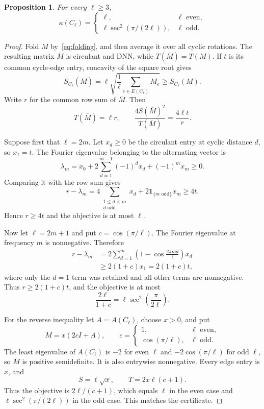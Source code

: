 \documentclass[11pt]{article}
\newtheorem{proposition}[theorem]{Proposition}
\theoremstyle{remark}
\begin{document}
\begin{proposition}\label{prop:cycle}
For every $\ell\geq3$,
\[
 \kappa(C_\ell)=
 \begin{cases}
  \ell,&\ell\text{ even},\\[1mm]
  \ell\sec^2(\pi/(2\ell)),&\ell\text{ odd}.
 \end{cases}
\]
\end{proposition}

\begin{proof}
 Fold $M$ by~\eqref{eq:folding}, and then average it over all cyclic
 rotations.  The resulting matrix $\overline M$ is circulant and DNN, while
 $T(\overline M)=T(M)$.  If $t$ is its common cycle-edge entry, concavity of
 the square root gives
 \[
  S_{C_\ell}(\overline M)
  =\ell\sqrt{\frac1\ell\sum_{e\in E(C_\ell)}M_e}
  \geq S_{C_\ell}(M).
 \]
 Write $r$ for the common row sum of $\overline M$.  Then
 \[
  T(\overline M)=\ell r,
  \qquad
  \frac{4S(\overline M)^2}{T(\overline M)}=\frac{4\ell t}{r}.
 \]

 Suppose first that $\ell=2m$.  Let $x_d\geq0$ be the circulant entry at
 cyclic distance $d$, so $x_1=t$.  The Fourier eigenvalue belonging to the
 alternating vector is
 \[
  \lambda_m=x_0+2\sum_{d=1}^{m-1}(-1)^d x_d+(-1)^m x_m\geq0.
 \]
 Comparing it with the row sum gives
 \[
  r-\lambda_m
  =4\sum_{\substack{1\leq d<m\\d\text{ odd}}}x_d
   +2\mathbf1_{\{m\text{ odd}\}}x_m
  \geq4t.
 \]
 Hence $r\geq4t$ and the objective is at most $\ell$.

 Now let $\ell=2m+1$ and put $c=\cos(\pi/\ell)$.  The Fourier eigenvalue at
 frequency $m$ is nonnegative.  Therefore
 \begin{align*}
  r-\lambda_m
  &=2\sum_{d=1}^{m}
    \left(1-\cos\frac{2\pi md}{\ell}\right)x_d\\
  &\geq2(1+c)x_1=2(1+c)t,
 \end{align*}
 where only the $d=1$ term was retained and all other terms are
 nonnegative.  Thus $r\geq2(1+c)t$, and the objective is at most
 \[
  \frac{2\ell}{1+c}=\ell\sec^2\!\left(\frac{\pi}{2\ell}\right).
 \]

For the reverse inequality let $A=A(C_\ell)$, choose $x>0$, and put
\begin{equation}\label{eq:cycle-primal}
 M=x(2cI+A),
 \qquad
 c=
 \begin{cases}
  1,&\ell\text{ even},\\
  \cos(\pi/\ell),&\ell\text{ odd}.
 \end{cases}
\end{equation}
The least eigenvalue of $A(C_\ell)$ is $-2$ for even $\ell$ and
$-2\cos(\pi/\ell)$ for odd $\ell$, so $M$ is positive semidefinite.  It is
also entrywise nonnegative.  Every edge entry is $x$, and
\[
 S=\ell\sqrt{x},
 \qquad T=2x\ell(c+1).
\]
Thus the objective is $2\ell/(c+1)$, which equals $\ell$ in the even case and
$\ell\sec^2(\pi/(2\ell))$ in the odd case.  This matches the certificate.
\end{proof}
\end{document}
